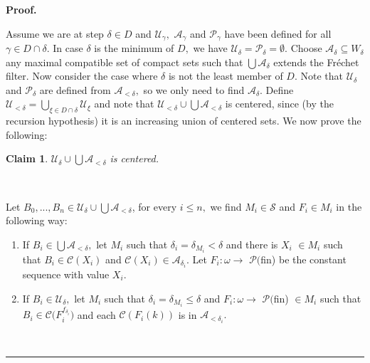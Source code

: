 \documentclass{article}%
\newtheorem{claim}[theorem]{Claim}
\newenvironment{proof}[1][Proof]{\noindent\textbf{#1.} }{\ \rule{0.5em}{0.5em}}
\begin{document}
\begin{proof}
\qquad\ \ \ \ \qquad\ \ \ 

Assume we are at step $\delta\in D$ and $\mathcal{U}_{\gamma},$ $\mathcal{A}%
_{\gamma}$ and $\mathcal{P}_{\gamma}$ have been defined for all $\gamma\in
D\cap\delta.$ In case $\delta$ is the minimum of $D,$ we have $\mathcal{U}%
_{\delta}=\mathcal{P}_{\delta}=\emptyset.$ Choose $\mathcal{A}_{\delta
}\subseteq W_{\delta}$ any maximal compatible set of compact sets such that $%
{\textstyle\bigcup}
\mathcal{A}_{\delta}$ extends the Fr\'{e}chet filter. Now consider the case
where $\delta$ is not the least member of $D.$ Note that $\mathcal{U}_{\delta
}$ and $\mathcal{P}_{\delta}$ are defined from $\mathcal{A}_{<\delta},$ so we
only need to find $\mathcal{A}_{\delta}.$ Define $\mathcal{U}_{<\delta}=%
{\textstyle\bigcup\limits_{\xi\in D\cap\delta}}
\mathcal{U}_{\xi}$ and note that $\mathcal{U}_{<\delta}\cup%
{\textstyle\bigcup}
\mathcal{A}_{<\delta}$ is centered, since (by the recursion hypothesis) it is
an increasing union of centered sets. We now prove the following:

\begin{claim}
$\mathcal{U}_{\delta}\cup%
{\textstyle\bigcup}
\mathcal{A}_{<\delta}$ is centered.
\end{claim}

\qquad\ \ \ 

Let $B_{0},...,B_{n}\in\mathcal{U}_{\delta}\cup%
{\textstyle\bigcup}
\mathcal{A}_{<\delta}$, for every $i\leq n,$ we find $M_{i}\in\mathcal{S}$ and
$F_{i}\in M_{i}$ in the following way:

\begin{enumerate}
\item If $B_{i}\in%
{\textstyle\bigcup}
\mathcal{A}_{<\delta},$ let $M_{i}$ such that $\delta_{i}=\delta_{M_{i}%
}<\delta$ and there is $X_{i}$\textsf{ }$\in M_{i}$ such that $B_{i}%
\in\mathcal{C}\left(  X_{i}\right)  $ and $\mathcal{C}\left(  X_{i}\right)
\in\mathcal{A}_{\delta_{i}}.$ Let $F_{i}:\omega\longrightarrow$ $\mathcal{P(}%
$\textsf{fin)} be the constant sequence with value $X_{i}.$

\item If $B_{i}\in\mathcal{U}_{\delta},$ let $M_{i}$ such that $\delta
_{i}=\delta_{M_{i}}\leq\delta$ and $F_{i}:\omega\longrightarrow$
$\mathcal{P(}$\textsf{fin) }$\in M_{i}$ such that $B_{i}\in\mathcal{C(}%
F_{i}^{f_{\delta_{i}}})$ and each $\mathcal{C}\left(  F_{i}\left(  k\right)
\right)  $ is in $\mathcal{A}_{<\delta_{i}}.$
\end{enumerate}


\end{proof}
\end{document}
